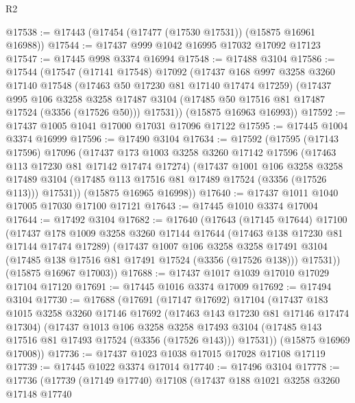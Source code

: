 \begin{lexlean}{R2}
\begin{coremodule}
@17538 := @17443 (@17454 (@17477 (@17530 @17531)) (@15875 @16961 @16988))
@17544 := @17437 @999 @1042 @16995 @17032 @17092 @17123
@17547 := @17445 @998 @3374 @16994
@17548 := @17488 @3104
@17586 := @17544
    (@17547
      (@17141 @17548)
      @17092
      (@17437
        @168
        @997
        @3258
        @3260
        @17140
        @17548
        (@17463 @50 @17230 @81 @17140 @17474 @17259)
        (@17437
          @995
          @106
          @3258
          @3258
          @17487
          @3104
          (@17485 @50 @17516 @81 @17487 @17524 (@3356 (@17526 @50)))
          @17531))
      (@15875 @16963 @16993))
@17592 := @17437 @1005 @1041 @17000 @17031 @17096 @17122
@17595 := @17445 @1004 @3374 @16999
@17596 := @17490 @3104
@17634 := @17592
    (@17595
      (@17143 @17596)
      @17096
      (@17437
        @173
        @1003
        @3258
        @3260
        @17142
        @17596
        (@17463 @113 @17230 @81 @17142 @17474 @17274)
        (@17437
          @1001
          @106
          @3258
          @3258
          @17489
          @3104
          (@17485 @113 @17516 @81 @17489 @17524 (@3356 (@17526 @113)))
          @17531))
      (@15875 @16965 @16998))
@17640 := @17437 @1011 @1040 @17005 @17030 @17100 @17121
@17643 := @17445 @1010 @3374 @17004
@17644 := @17492 @3104
@17682 := @17640
    (@17643
      (@17145 @17644)
      @17100
      (@17437
        @178
        @1009
        @3258
        @3260
        @17144
        @17644
        (@17463 @138 @17230 @81 @17144 @17474 @17289)
        (@17437
          @1007
          @106
          @3258
          @3258
          @17491
          @3104
          (@17485 @138 @17516 @81 @17491 @17524 (@3356 (@17526 @138)))
          @17531))
      (@15875 @16967 @17003))
@17688 := @17437 @1017 @1039 @17010 @17029 @17104 @17120
@17691 := @17445 @1016 @3374 @17009
@17692 := @17494 @3104
@17730 := @17688
    (@17691
      (@17147 @17692)
      @17104
      (@17437
        @183
        @1015
        @3258
        @3260
        @17146
        @17692
        (@17463 @143 @17230 @81 @17146 @17474 @17304)
        (@17437
          @1013
          @106
          @3258
          @3258
          @17493
          @3104
          (@17485 @143 @17516 @81 @17493 @17524 (@3356 (@17526 @143)))
          @17531))
      (@15875 @16969 @17008))
@17736 := @17437 @1023 @1038 @17015 @17028 @17108 @17119
@17739 := @17445 @1022 @3374 @17014
@17740 := @17496 @3104
@17778 := @17736
    (@17739
      (@17149 @17740)
      @17108
      (@17437
        @188
        @1021
        @3258
        @3260
        @17148
        @17740

\end{coremodule}
\end{lexlean}
